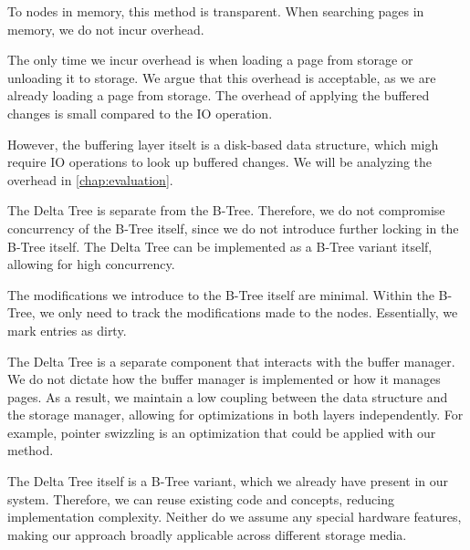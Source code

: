 To nodes in memory, this method is transparent.
When searching pages in memory, we do not incur overhead.

The only time we incur overhead is when loading a page from storage or unloading it to storage.
We argue that this overhead is acceptable, as we are already loading a page from storage.
The overhead of applying the buffered changes is small compared to the \ac{IO} operation.

However, the buffering layer itselt is a disk-based data structure, which migh require \ac{IO} operations to look up buffered changes.
We will be analyzing the overhead in \autoref{chap:evaluation}.    %

The Delta Tree is separate from the B-Tree.
Therefore, we do not compromise concurrency of the B-Tree itself, since we do not introduce further locking in the B-Tree itself.
The Delta Tree can be implemented as a B-Tree variant itself, allowing for high concurrency.

The modifications we introduce to the B-Tree itself are minimal.
Within the B-Tree, we only need to track the modifications made to the nodes.
Essentially, we mark entries as dirty. 

The Delta Tree is a separate component that interacts with the buffer manager.
We do not dictate how the buffer manager is implemented or how it manages pages.
As a result, we maintain a low coupling between the data structure and the storage manager, allowing for optimizations in both layers independently.
For example, pointer swizzling is an optimization that could be applied with our method.

The Delta Tree itself is a B-Tree variant, which we already have present in our system.
Therefore, we can reuse existing code and concepts, reducing implementation complexity.
Neither do we assume any special hardware features, making our approach broadly applicable across different storage media.


